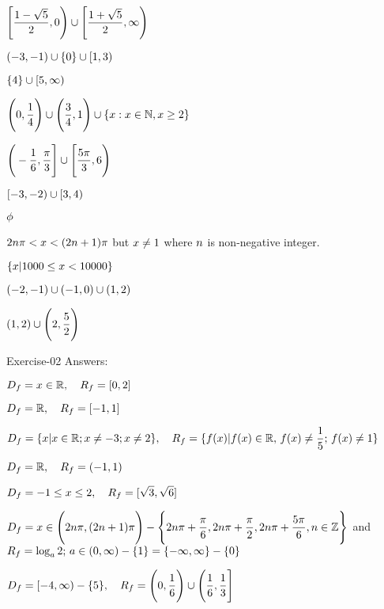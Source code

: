 \documentclass[addpoints]{exam}
\begin{document}
\begin{questions}
\question $\mathlarger{\Bigg[ \dfrac{1-\sqrt{5}}{2}, 0\Bigg)\cup \Bigg[ \dfrac{1+\sqrt{5}}{2},\infty\Bigg)}$

\question $\mathlarger{(-3,-1)\cup \{0\}\cup [1,3)}$

\question $\mathlarger{\{4\}\cup [5,\infty)}$

\question $\mathlarger{\Bigg(0,\dfrac{1}{4}\Bigg)\cup \Bigg(\dfrac{3}{4}, 1\Bigg)\cup\{x:x \in \mathbb{N}, x\ge 2\}}$

\question $\mathlarger{\Bigg(-\dfrac{1}{6},\dfrac{\pi}{3}\Bigg]\cup \Bigg[\dfrac{5\pi}{3},6\Bigg)}$

\question $\mathlarger{[-3,-2)\cup [3,4)}$

\question $\mathlarger{\phi}$

\question $\mathlarger{2n\pi <x<(2n+1)\pi}$ but $\mathlarger{x\neq 1}$ where $\mathlarger{n}$ is non-negative integer.

                                                                                                              \question $\mathlarger{\{x|1000\le x < 10000\}}$

\question $\mathlarger{(-2,-1)\cup (-1,0)\cup(1,2)}$

\question $\mathlarger{(1,2)\cup \Bigg(2,\dfrac{5}{2}\Bigg)}$

\end{questions}
\begin{center}
\begin{LARGE}
Exercise-02
Answers:
\end{LARGE}
\end{center}
\begin{questions}

\question $\mathlarger{D_{f} = x\in \mathbb{R},\quad R_{f} = [0,2]}$

\question $\mathlarger{D_{f} = \mathbb{R},\quad R_{f} = [-1,1]}$

\question $\mathlarger{D_{f} = \{x|x\in \mathbb{R}; x\neq -3; x\neq 2 \},\quad R_{f} = \{f(x)|f(x)\in \mathbb{R},\, f(x)\neq \dfrac{1}{5};\,f(x)\neq 1\} }$

\question $\mathlarger{D_{f} = \mathbb{R},\quad R_{f} = (-1,1)}$

\question $\mathlarger{D_{f} = -1\le x \le 2,\quad R_{f} = [\sqrt{3},\sqrt{6}]}$

\question $\mathlarger{D_{f} = x\in \Bigg(2n\pi, (2n+1)\pi\Bigg)} - \Bigg\{ 2n\pi + \dfrac{\pi}{6}, 2n\pi + \dfrac{\pi}{2}, 2n\pi + \dfrac{5\pi}{6}, n\in \mathbb{Z} \Bigg\}$ and\\ $\mathlarger{R_{f} = \log_{a}2;\, a\in (0,\infty)-\{1\} = \{-\infty, \infty\}-\{0\}}$

\question $\mathlarger{D_{f} =[-4, \infty) - \{5\},\quad R_{f} = \Bigg(0,\dfrac{1}{6}\Bigg) \cup \Bigg(\dfrac{1}{6}, \dfrac{1}{3}\Bigg]}$

\end{questions}
\end{document}
